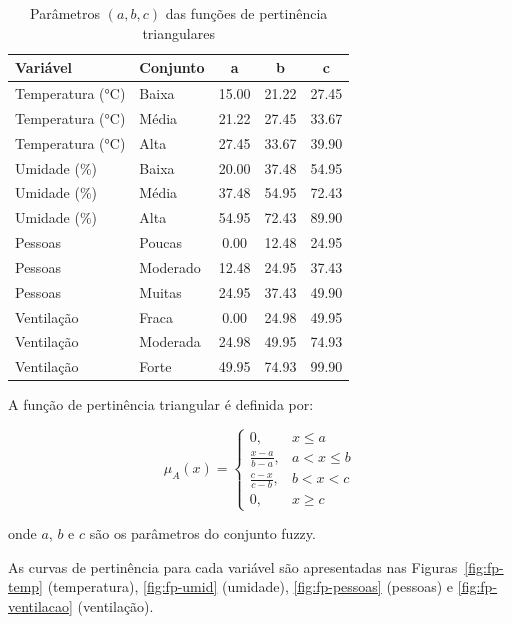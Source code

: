 \begin{table}[ht]
\centering
\caption{Parâmetros $(a, b, c)$ das funções de pertinência triangulares}
\label{tab:parametros-triangulares}
\begin{tabular}{llccc}
\hline
\textbf{Variável} & \textbf{Conjunto} & \textbf{a} & \textbf{b} & \textbf{c} \\
\hline
Temperatura (°C) & Baixa   & 15.00 & 21.22 & 27.45 \\
Temperatura (°C) & Média   & 21.22 & 27.45 & 33.67 \\
Temperatura (°C) & Alta    & 27.45 & 33.67 & 39.90 \\
\hline
Umidade (\%)     & Baixa   & 20.00 & 37.48 & 54.95 \\
Umidade (\%)     & Média   & 37.48 & 54.95 & 72.43 \\
Umidade (\%)     & Alta    & 54.95 & 72.43 & 89.90 \\
\hline
Pessoas          & Poucas  & 0.00  & 12.48 & 24.95 \\
Pessoas          & Moderado& 12.48 & 24.95 & 37.43 \\
Pessoas          & Muitas  & 24.95 & 37.43 & 49.90 \\
\hline
Ventilação       & Fraca   & 0.00  & 24.98 & 49.95 \\
Ventilação       & Moderada& 24.98 & 49.95 & 74.93 \\
Ventilação       & Forte   & 49.95 & 74.93 & 99.90 \\
\hline
\end{tabular}
\end{table}


A função de pertinência triangular é definida por:

\begin{equation}
\mu_{A}(x) =
\begin{cases}
0, & x \leq a \\
\frac{x-a}{b-a}, & a < x \leq b \\
\frac{c-x}{c-b}, & b < x < c \\
0, & x \geq c
\end{cases}
\end{equation}

onde $a$, $b$ e $c$ são os parâmetros do conjunto fuzzy.

As curvas de pertinência para cada variável são apresentadas nas Figuras~\ref{fig:fp-temp} (temperatura), \ref{fig:fp-umid} (umidade), \ref{fig:fp-pessoas} (pessoas) e \ref{fig:fp-ventilacao} (ventilação).

